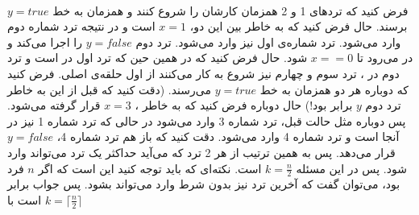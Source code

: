 \\\noindent
فرض کنید که ترد‌های 1 و 2 همزمان کارشان را شروع کنند و همزمان به خط
$y = true$
برسند. حال فرض کنید که به خاطر
بین این دو،
$x = 1$
است و در نتیجه ترد شماره دوم وارد
می‌شود. ترد شماره‌ی اول نیز وارد
می‌شود. ترد دوم
$y = false$
را اجرا می‌کند و در
می‌رود تا
$x == 0$
شود.
حال فرض کنید که در همین حین که ترد اول در
است و ترد دوم در
،
ترد سوم و چهارم نیز شروع به کار می‌کنند از اول حلقه‌ی اصلی.
فرض کنید که دوباره هر دو همزمان به خط
$y = true$
می‌رسند.
(دقت کنید که قبل از این به خاطر ترد دوم
$y$
برابر
بود!)
حال دوباره فرض کنید که به خاطر
،
$x = 3$
قرار گرفته می‌شود. پس دوباره مثل حالت قبل،
ترد شماره 3 وارد
می‌شود در حالی که ترد شماره 1 نیز در آنجا است و ترد شماره 4 وارد
می‌شود. دقت کنید که باز هم ترد شماره 4،
$y = false$
قرار می‌دهد.
پس به همین ترتیب از هر 2 ترد که می‌آید حداکثر یک ترد می‌تواند وارد
شود. پس در این مسئله
$k = \frac{n}{2}$
است. نکته‌ای که باید توجه کنید این است که اگر
$n$
فرد بود، می‌توان گفت که آخرین ترد نیز بدون شرط وارد
می‌تواند بشود. پس جواب برابر است با
$k = \lceil \frac{n}{2} \rceil$